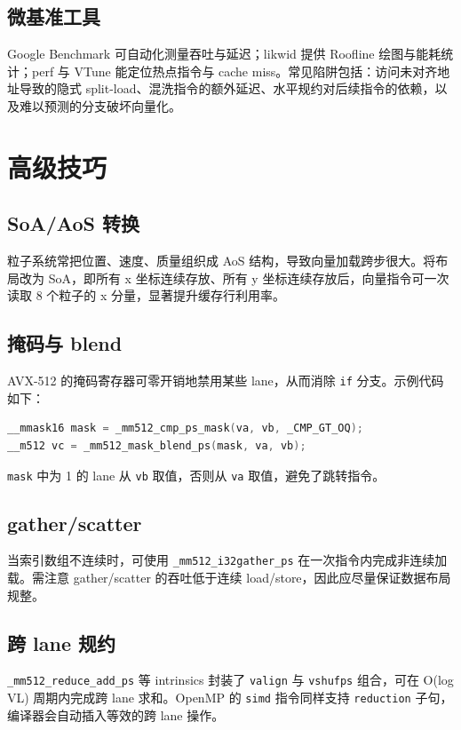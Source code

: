 \section{微基准工具}
Google Benchmark 可自动化测量吞吐与延迟；likwid 提供 Roofline 绘图与能耗统计；perf 与 VTune 能定位热点指令与 cache miss。常见陷阱包括：访问未对齐地址导致的隐式 split-load、混洗指令的额外延迟、水平规约对后续指令的依赖，以及难以预测的分支破坏向量化。\par
\chapter{高级技巧}
\section{SoA/AoS 转换}
粒子系统常把位置、速度、质量组织成 AoS 结构，导致向量加载跨步很大。将布局改为 SoA，即所有 x 坐标连续存放、所有 y 坐标连续存放后，向量指令可一次读取 8 个粒子的 x 分量，显著提升缓存行利用率。\par
\section{掩码与 blend}
AVX-512 的掩码寄存器可零开销地禁用某些 lane，从而消除 \texttt{if} 分支。示例代码如下：\par
\begin{lstlisting}[language=c]
__mmask16 mask = _mm512_cmp_ps_mask(va, vb, _CMP_GT_OQ);
__m512 vc = _mm512_mask_blend_ps(mask, va, vb);
\end{lstlisting}
\texttt{mask} 中为 1 的 lane 从 \texttt{vb} 取值，否则从 \texttt{va} 取值，避免了跳转指令。\par
\section{gather/scatter}
当索引数组不连续时，可使用 \texttt{\_{}mm512\_{}i32gather\_{}ps} 在一次指令内完成非连续加载。需注意 gather/scatter 的吞吐低于连续 load/store，因此应尽量保证数据布局规整。\par
\section{跨 lane 规约}
\texttt{\_{}mm512\_{}reduce\_{}add\_{}ps} 等 intrinsics 封装了 \texttt{valign} 与 \texttt{vshufps} 组合，可在 O(log VL) 周期内完成跨 lane 求和。OpenMP 的 \texttt{simd} 指令同样支持 \texttt{reduction} 子句，编译器会自动插入等效的跨 lane 操作。\par
